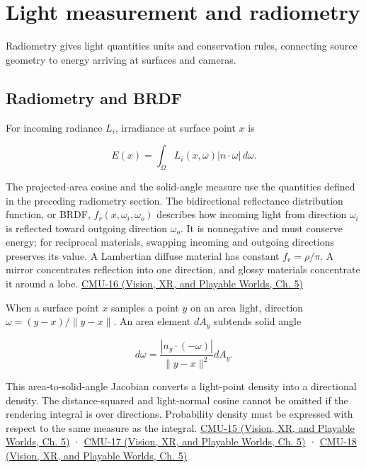 \section{Light measurement and radiometry}\label{03-visual-computing-i-ch004-light-measurement-and-radiometry}

\hypertarget{03-visual-computing-i-ch004-light-measurement-and-radiometry}{}

Radiometry gives light quantities units and conservation rules, connecting source geometry to energy arriving at surfaces and cameras.

\subsection{Radiometry and BRDF}\label{03-visual-computing-i-ch004-radiometry-and-brdf}

\hypertarget{03-visual-computing-i-ch004-radiometry-and-brdf}{}

For incoming radiance \(L_i\), irradiance at surface point \(x\) is

\[
E(x)=\int_\Omega L_i(x,\omega)|n\cdot\omega|\,d\omega.
\]

The projected-area cosine and the solid-angle measure use the quantities defined in the preceding radiometry section. The bidirectional reflectance distribution function, or BRDF, \(f_r(x,\omega_i,\omega_o)\) describes how incoming light from direction \(\omega_i\) is reflected toward outgoing direction \(\omega_o\). It is nonnegative and must conserve energy; for reciprocal materials, swapping incoming and outgoing directions preserves its value. A Lambertian diffuse material has constant \(f_r=\rho/\pi\). A mirror concentrates reflection into one direction, and glossy materials concentrate it around a lobe. \href{../07-Vision-XR-and-Playable-Worlds/main.pdf\#nameddest=04-visual-computing-ii-ch036-cmu-16---the-rendering-equation}{CMU-16 (Vision, XR, and Playable Worlds, Ch. 5)}

When a surface point \(x\) samples a point \(y\) on an area light, direction \(\omega=(y-x)/\|y-x\|\). An area element \(dA_y\) subtends solid angle

\[
d\omega=\frac{|n_y\cdot(-\omega)|}{\|y-x\|^2}dA_y.
\]

This area-to-solid-angle Jacobian converts a light-point density into a directional density. The distance-squared and light-normal cosine cannot be omitted if the rendering integral is over directions. Probability density must be expressed with respect to the same measure as the integral. \href{../07-Vision-XR-and-Playable-Worlds/main.pdf\#nameddest=04-visual-computing-ii-ch036-cmu-15---radiometry}{CMU-15 (Vision, XR, and Playable Worlds, Ch. 5)} · \href{../07-Vision-XR-and-Playable-Worlds/main.pdf\#nameddest=04-visual-computing-ii-ch036-cmu-17---numerical-integration}{CMU-17 (Vision, XR, and Playable Worlds, Ch. 5)} · \href{../07-Vision-XR-and-Playable-Worlds/main.pdf\#nameddest=04-visual-computing-ii-ch036-cmu-18---monte-carlo-rendering}{CMU-18 (Vision, XR, and Playable Worlds, Ch. 5)}

